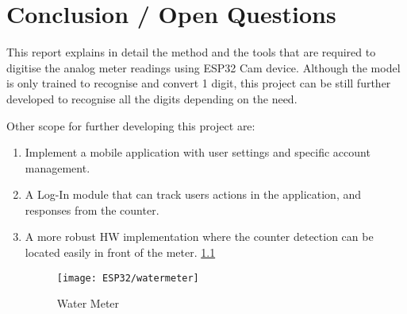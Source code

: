 %
%
%


\chapter{Conclusion / Open Questions}

This report explains in detail the method and the tools that are required to digitise the analog meter readings using ESP32 Cam device. Although the model is only trained to recognise and convert 1 digit, this project can be still further developed to recognise all the digits depending on the need. 

Other scope for further developing this project are: 

\begin{enumerate}
	\item Implement a mobile application with user settings and specific account management.
	\item A Log-In module that can track users actions in the application, and responses from the counter.
	\item A more robust HW implementation where the counter detection can be located easily in front of the meter. \ref{fig:Water Meter}
	\begin{figure}  [H]
		\begin{center}
			\texttt{[image: ESP32/watermeter]}
			\caption{Water Meter} 
			\label{fig:Water Meter}
		\end{center}
	\end{figure}
\end{enumerate}







